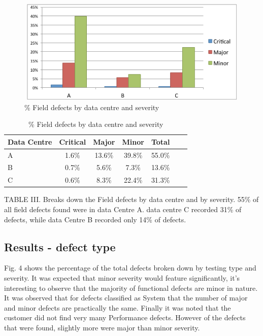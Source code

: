 \begin{figure}
\begin{center}
\includegraphics[height=5cm, width=14cm]{graphs/social_test/graph3.pdf} 
\caption{\% Field defects by data centre and severity}
\end{center}
\label{fig:defectdatacentre}
\end{figure}

\begin {table}
\caption {}
\caption {\% Field defects by data centre and severity} 
\begin{center}
\begin{tabular}{l*{5}{c}r} Data Centre & Critical & Major & Minor &  Total \\ \hline A & 1.6\%	 & 13.6\%	& 39.8\%	& 55.0\% \\ B & 0.7\% & 5.6\% & 7.3\% & 13.6\% \\ C & 0.6\% & 8.3\% & 22.4\%	 & 31.3\%   \end{tabular}
\end{center}
\end{table}


TABLE III. Breaks down the Field defects by data centre and by severity.  55\% of all field defects found were in data Centre A. data centre C recorded 31\% of defects, while data Centre B recorded only 14\% of defects. 

\subsection{Results - defect type}

Fig. 4 shows the percentage of the total defects broken down by testing type and severity. It was expected that minor severity would feature significantly, it's interesting to observe that the majority of functional defects are minor in nature. It was observed that for defects classified as System that the number of major and minor defects are practically the same. Finally it was noted that the customer did not find very many Performance defects. However of the defects that were found, slightly more were major than minor severity.

